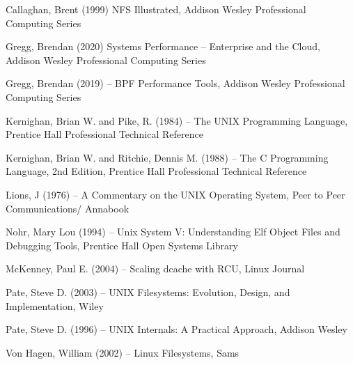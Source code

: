 \begin{thebibliography}{9}


	Callaghan, Brent (1999) NFS Illustrated, Addison Wesley Professional Computing Series

	Gregg, Brendan (2020) Systems Performance -- Enterprise and the Cloud, Addison Wesley Professional Computing Series

	Gregg, Brendan (2019) -- BPF Performance Tools, Addison Wesley Professional Computing Series

	Kernighan, Brian W. and Pike, R. (1984) -- The UNIX Programming Language, Prentice Hall Professional Technical Reference
	
	Kernighan, Brian W. and Ritchie, Dennis M. (1988) -- The C Programming Language, 2nd Edition, Prentice Hall Professional Technical Reference
	
	Lions, J (1976) -- A Commentary on the UNIX Operating System, Peer to Peer Communications/ Annabook
	
Nohr, Mary Lou (1994) -- Unix System V: Understanding Elf Object Files and Debugging Tools, Prentice Hall Open Systems Library

	McKenney, Paul E. (2004) -- Scaling dcache with RCU, Linux Journal

	Pate, Steve D. (2003) -- UNIX Filesystems: Evolution, Design, and Implementation, Wiley

	Pate, Steve D. (1996) -- UNIX Internals: A Practical Approach, Addison Wesley 

	Von Hagen, William (2002) -- Linux Filesystems, Sams

\end{thebibliography}

